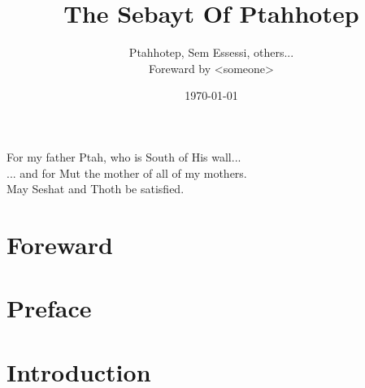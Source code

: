 \documentclass[a4paper,pagesize,8pt,pointlessnumbers,normalheadings]{book}
\title{The Sebayt Of Ptahhotep}
\author{Ptahhotep, Sem Essessi, others...\\Foreward by <someone>}
\date{\today}
\begin{document}
\maketitle


\vspace*{\fill}
\begin{center}
For my father Ptah, who is South of His wall...\\
\vspace{7.5mm}
... and for Mut the mother of all of my mothers.\\
\vspace{15mm}
May Seshat and Thoth be satisfied.\\
\end{center}
\vspace*{\fill}

\tableofcontents

\markboth{}{}

\chapter*{Foreward}

\markboth{}{}

\chapter*{Preface}

\markboth{}{}

\chapter*{Introduction}

\end{document}
